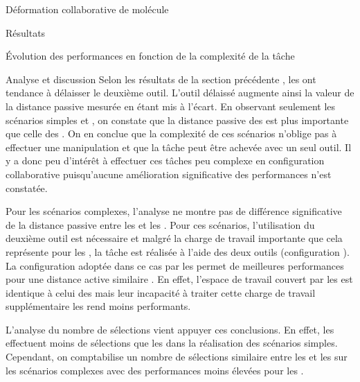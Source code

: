 \documentclass[myfrancais,ngerman,english,french]{mythesis}
\begin{document}
\begin{mychapter}{Déformation collaborative de molécule}
\begin{mysection}{Résultats}
\begin{mysubsection}{Évolution des performances en fonction de la complexité de la tâche}
\begin{mysubsubsection}{Analyse et discussion}
					Selon les résultats de la section précédente , les  ont tendance à délaisser le deuxième outil.
					L'outil délaissé augmente ainsi la valeur de la distance passive mesurée en étant mis à l'écart.
					En observant seulement les scénarios simples  et , on constate que la distance passive des  est plus importante que celle des .
					On en conclue que la complexité de ces scénarios n'oblige pas à effectuer une manipulation  et que la tâche peut être achevée avec un seul outil.
					Il y a donc peu d'intérêt à effectuer ces tâches peu complexe en configuration collaborative puisqu'aucune amélioration significative des performances n'est constatée.

					Pour les scénarios complexes, l'analyse ne montre pas de différence significative de la distance passive entre les  et les .
					Pour ces scénarios, l'utilisation du deuxième outil est nécessaire et malgré la charge de travail importante que cela représente pour les , la tâche est réalisée à l'aide des deux outils (configuration ).
					La configuration  adoptée dans ce cas par les  permet de meilleures performances  pour une distance active similaire .
					En effet, l'espace de travail couvert par les  est identique à celui des  mais leur incapacité à traiter cette charge de travail supplémentaire les rend moins performants.

					L'analyse du nombre de sélections vient appuyer ces conclusions.
					En effet, les  effectuent moins de sélections que les  dans la réalisation des scénarios simples.
					Cependant, on comptabilise un nombre de sélections similaire entre les  et les  sur les scénarios complexes avec des performances moins élevées pour les .


\end{mysubsubsection}
\end{mysubsection}
\end{mysection}
\end{mychapter}
\end{document}

